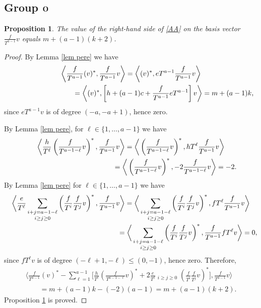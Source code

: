 \documentclass[pdftex]{sigma}
\numberwithin{equation}{section}
\newtheorem{prop}[thm]{Proposition}
{\theoremstyle{definition}
\newtheorem*{rem}{Remark}}
\begin{document}
\subsection[Group ${\rm O}$]{Group $\boldsymbol{{\rm O}}$}\label{subsec group O}
\begin{prop}\label{Pr4}The value of the right-hand side of \eqref{AA} on the basis vector $\frac{f}{T^{a-1}}v$ equals $m + (a-1)(k+2)$.
\end{prop}
\begin{proof}By Lemma \ref{lem pere} we have{\samepage
\begin{gather*}
\left\langle \frac{f}{T^{a-1}} (v)^*, \frac{f}{T^{a-1}} v \right\rangle = \left\langle (v)^*, eT^{a-1} \frac{f}{T^{a-1}} v \right\rangle \\
\hphantom{\left\langle \frac{f}{T^{a-1}} (v)^*, \frac{f}{T^{a-1}} v \right\rangle} = \left\langle (v)^*, \left[ h+(a-1)c + \frac{f}{T^{a-1}} eT^{a-1} \right] v \right\rangle = m + (a-1)k,
\end{gather*}
since $eT^{a-1} v$ is of degree $(-a, -a+1)$, hence zero.}

By Lemma \ref{lem pere}, for $ \ell \in \{ 1, \dots, a-1 \}$ we have
\begin{gather*}
 \bigg\langle \frac{h}{T^{\ell}} \left( \frac{f}{T^{a-1-\ell}} v \right)^*, \frac{f}{T^{a-1}} v \bigg\rangle
 = \bigg\langle \left( \frac{f}{T^{a-1-\ell}} v \right)^*, hT^{\ell} \frac{f}{T^{a-1}} v \bigg\rangle \\
 \hphantom{\bigg\langle \frac{h}{T^{\ell}} \left( \frac{f}{T^{a-1-\ell}} v \right)^*, \frac{f}{T^{a-1}} v \bigg\rangle}{} = \bigg\langle \left( \frac{f}{T^{a-1-\ell}} v \right)^*, -2 \frac{f}{T^{a-1-\ell}} v \bigg\rangle = -2.
\end{gather*}
By Lemma \ref{lem pere} for $ \ell \in \{ 1, \dots, a-1 \}$ we have
\begin{gather*}
\bigg\langle \frac{e}{T^{\ell}} \mathop{\sum_{i+j=a-1-\ell}}_{i\geq j\geq 0} \left(\frac{f}{T^i} \frac{f}{T^j}v \right)^*, \frac{f}{T^{a-1}} v \bigg\rangle = \bigg\langle \mathop{\sum_{i+j=a-1-\ell}}_{i\geq j\geq 0} \left(\frac{f}{T^i} \frac{f}{T^j}v \right)^*, fT^{\ell} \frac{f}{T^{a-1}} v \bigg\rangle \\
\hphantom{\bigg\langle \frac{e}{T^{\ell}} \mathop{\sum_{i+j=a-1-\ell}}_{i\geq j\geq 0} \left(\frac{f}{T^i} \frac{f}{T^j}v \right)^*, \frac{f}{T^{a-1}} v \bigg\rangle} = \bigg\langle \mathop{\sum_{i+j=a-1-\ell}}_{i\geq j\geq 0} \left(\frac{f}{T^i} \frac{f}{T^j}v \right)^*, \frac{f}{T^{a-1}} fT^{\ell} v \bigg\rangle =0,
\end{gather*}
since $fT^{\ell} v$ is of degree $ (-\ell+1, -\ell) \leq (0,-1)$, hence zero. Therefore,
\begin{gather*}
\bigg\langle \frac{f}{T^{a-1}} (v)^* - \sum_{\ell=1}^{a-1} \bigg[\frac{h}{T^\ell}\left(\frac{f}{T^{a-1-\ell}}v\right)^* + 2\frac{e}{T^\ell} \mathop{\sum_{i+j=a-1-\ell}}_{i\geq j\geq 0} \left(\frac{f}{T^i}\frac{f}{T^j}v\right)^* \bigg], \frac{f}{T^{a-1}} v \bigg\rangle \\
\qquad{}= m + (a-1)k - (-2)(a-1) = m + (a-1)(k+2).
\end{gather*}
Proposition \ref{Pr4} is proved.
\end{proof}
\end{document}
